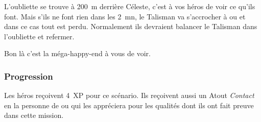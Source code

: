 L’oubliette se trouve à 200~m derrière Céleste, c’est à vos héros de voir ce qu’ils font. Mais s’ils ne font rien dans les 2~mn, le Talisman va s’accrocher à  ou  et dans ce cas tout est perdu. Normalement ils devraient balancer le Talisman dans l’oubliette et refermer.

Bon là c’est la méga-happy-end à vous de voir.

\subsubsection{Progression}
Les héros reçoivent 4~XP pour ce scénario. Ils reçoivent aussi un Atout \textit{Contact} en la personne de  ou  qui les appréciera pour les qualités dont ils ont fait preuve dans cette mission.